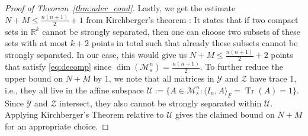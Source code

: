 \documentclass[12pt,a4paper]{article}
\theoremstyle{definition}
\DeclareMathOperator{\tr}{Tr}
\newcommand\R{\mathbb{R}}
\newcommand\CU{\mathcal{U}}
\newcommand\CY{\mathcal{Y}}
\newcommand\CZ{\mathcal{Z}}
\newcommand\ms[1]{\mathcal{M}_s^{#1}}
\begin{document}
\begin{proof}[Proof of Theorem~\ref{thm:ader_cond}]
Lastly, we get the estimate $N+M \leq \frac{n (n+1)}{2} + 1$ from Kirchberger's theorem \cite[Theorem~$1.3.11$]{schneider}: It states that if two compact sets in $\R^k$ cannot be strongly separated, then one can choose two subsets of these sets with at most $k+2$ points in total such that already these subsets cannot be strongly separated. In our case, this would give us $N+M \leq \frac{n (n+1)}{2} + 2$ points that satisfy \eqref{eq:decomp} since $\dim(\ms{n}) = \frac{n (n+1)}{2}$. To further reduce the upper bound on $N+M$ by $1$, we note that all matrices in $\CY$ and $\CZ$ have trace $1$, i.e., they all live in the affine subspace $\CU := \{ A \in \ms{n} : \langle I_n, A \rangle_F = \tr(A) = 1 \}$. Since $\CY$ and $\CZ$ intersect, they also cannot be strongly separated within $\CU$. Applying Kirchberger's Theorem relative to $\CU$ gives the claimed bound on $N+M$ for an appropriate choice.
\end{proof}
\end{document}
